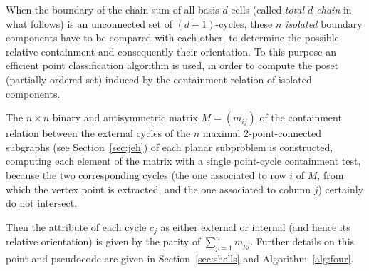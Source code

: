When the boundary of the chain sum of all basis $d$-cells {(called \emph{total $d$-chain} in what follows)} is an unconnected set of $(d-1)$-cycles, these $n$  \emph{isolated}  boundary components have to be compared with each other, to determine the possible relative containment and consequently their orientation. To    this purpose an efficient point classification algorithm is {used}, in order to compute the poset (partially ordered set) {induced by the} containment relation of isolated components. 

The $n\times n$ binary and antisymmetric matrix $M=(m_{ij})$ of the containment relation between the external cycles of the $n$ maximal 2-point-connected subgraphs (see Section~\ref{sec:jeh}) of each planar subproblem is constructed, computing each element of the matrix with a single point-cycle containment test, because the two corresponding cycles (the one associated to row $i$ of $M$, from which   the vertex point is extracted, and the one associated to column $j$) certainly do not intersect. 

Then the attribute of each cycle $c_j$ as either external or internal (and hence its relative orientation) is given by the parity of $\sum_{p=1}^n m_{pj}$.
Further details on this point and pseudocode are given in Section~\ref{sec:shells} and Algorithm~\ref{alg:four}.


